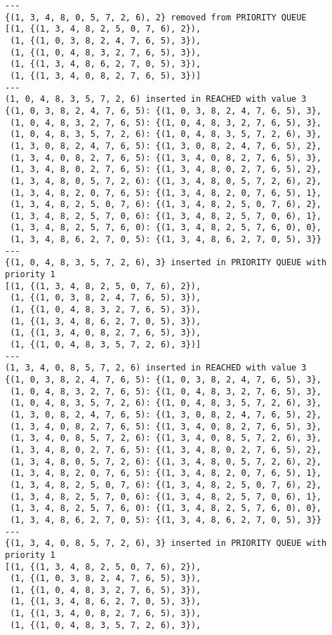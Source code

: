 \documentclass{article}
\begin{document}
\begin{verbatim}
---
{(1, 3, 4, 8, 0, 5, 7, 2, 6), 2} removed from PRIORITY QUEUE
[(1, {(1, 3, 4, 8, 2, 5, 0, 7, 6), 2}),
 (1, {(1, 0, 3, 8, 2, 4, 7, 6, 5), 3}),
 (1, {(1, 0, 4, 8, 3, 2, 7, 6, 5), 3}),
 (1, {(1, 3, 4, 8, 6, 2, 7, 0, 5), 3}),
 (1, {(1, 3, 4, 0, 8, 2, 7, 6, 5), 3})]
---
(1, 0, 4, 8, 3, 5, 7, 2, 6) inserted in REACHED with value 3
{(1, 0, 3, 8, 2, 4, 7, 6, 5): {(1, 0, 3, 8, 2, 4, 7, 6, 5), 3},
 (1, 0, 4, 8, 3, 2, 7, 6, 5): {(1, 0, 4, 8, 3, 2, 7, 6, 5), 3},
 (1, 0, 4, 8, 3, 5, 7, 2, 6): {(1, 0, 4, 8, 3, 5, 7, 2, 6), 3},
 (1, 3, 0, 8, 2, 4, 7, 6, 5): {(1, 3, 0, 8, 2, 4, 7, 6, 5), 2},
 (1, 3, 4, 0, 8, 2, 7, 6, 5): {(1, 3, 4, 0, 8, 2, 7, 6, 5), 3},
 (1, 3, 4, 8, 0, 2, 7, 6, 5): {(1, 3, 4, 8, 0, 2, 7, 6, 5), 2},
 (1, 3, 4, 8, 0, 5, 7, 2, 6): {(1, 3, 4, 8, 0, 5, 7, 2, 6), 2},
 (1, 3, 4, 8, 2, 0, 7, 6, 5): {(1, 3, 4, 8, 2, 0, 7, 6, 5), 1},
 (1, 3, 4, 8, 2, 5, 0, 7, 6): {(1, 3, 4, 8, 2, 5, 0, 7, 6), 2},
 (1, 3, 4, 8, 2, 5, 7, 0, 6): {(1, 3, 4, 8, 2, 5, 7, 0, 6), 1},
 (1, 3, 4, 8, 2, 5, 7, 6, 0): {(1, 3, 4, 8, 2, 5, 7, 6, 0), 0},
 (1, 3, 4, 8, 6, 2, 7, 0, 5): {(1, 3, 4, 8, 6, 2, 7, 0, 5), 3}}
---
{(1, 0, 4, 8, 3, 5, 7, 2, 6), 3} inserted in PRIORITY QUEUE with priority 1
[(1, {(1, 3, 4, 8, 2, 5, 0, 7, 6), 2}),
 (1, {(1, 0, 3, 8, 2, 4, 7, 6, 5), 3}),
 (1, {(1, 0, 4, 8, 3, 2, 7, 6, 5), 3}),
 (1, {(1, 3, 4, 8, 6, 2, 7, 0, 5), 3}),
 (1, {(1, 3, 4, 0, 8, 2, 7, 6, 5), 3}),
 (1, {(1, 0, 4, 8, 3, 5, 7, 2, 6), 3})]
---
(1, 3, 4, 0, 8, 5, 7, 2, 6) inserted in REACHED with value 3
{(1, 0, 3, 8, 2, 4, 7, 6, 5): {(1, 0, 3, 8, 2, 4, 7, 6, 5), 3},
 (1, 0, 4, 8, 3, 2, 7, 6, 5): {(1, 0, 4, 8, 3, 2, 7, 6, 5), 3},
 (1, 0, 4, 8, 3, 5, 7, 2, 6): {(1, 0, 4, 8, 3, 5, 7, 2, 6), 3},
 (1, 3, 0, 8, 2, 4, 7, 6, 5): {(1, 3, 0, 8, 2, 4, 7, 6, 5), 2},
 (1, 3, 4, 0, 8, 2, 7, 6, 5): {(1, 3, 4, 0, 8, 2, 7, 6, 5), 3},
 (1, 3, 4, 0, 8, 5, 7, 2, 6): {(1, 3, 4, 0, 8, 5, 7, 2, 6), 3},
 (1, 3, 4, 8, 0, 2, 7, 6, 5): {(1, 3, 4, 8, 0, 2, 7, 6, 5), 2},
 (1, 3, 4, 8, 0, 5, 7, 2, 6): {(1, 3, 4, 8, 0, 5, 7, 2, 6), 2},
 (1, 3, 4, 8, 2, 0, 7, 6, 5): {(1, 3, 4, 8, 2, 0, 7, 6, 5), 1},
 (1, 3, 4, 8, 2, 5, 0, 7, 6): {(1, 3, 4, 8, 2, 5, 0, 7, 6), 2},
 (1, 3, 4, 8, 2, 5, 7, 0, 6): {(1, 3, 4, 8, 2, 5, 7, 0, 6), 1},
 (1, 3, 4, 8, 2, 5, 7, 6, 0): {(1, 3, 4, 8, 2, 5, 7, 6, 0), 0},
 (1, 3, 4, 8, 6, 2, 7, 0, 5): {(1, 3, 4, 8, 6, 2, 7, 0, 5), 3}}
---
{(1, 3, 4, 0, 8, 5, 7, 2, 6), 3} inserted in PRIORITY QUEUE with priority 1
[(1, {(1, 3, 4, 8, 2, 5, 0, 7, 6), 2}),
 (1, {(1, 0, 3, 8, 2, 4, 7, 6, 5), 3}),
 (1, {(1, 0, 4, 8, 3, 2, 7, 6, 5), 3}),
 (1, {(1, 3, 4, 8, 6, 2, 7, 0, 5), 3}),
 (1, {(1, 3, 4, 0, 8, 2, 7, 6, 5), 3}),
 (1, {(1, 0, 4, 8, 3, 5, 7, 2, 6), 3}),

\end{verbatim}
\end{document}
